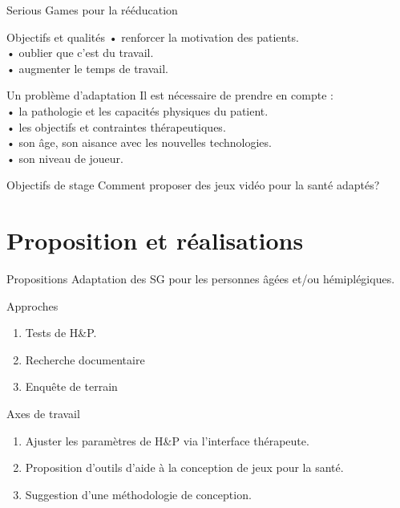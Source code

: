 \documentclass{beamer}
\begin{document}
		\begin{frame}{Serious Games pour la rééducation}
			\begin{exampleblock}{Objectifs et qualités}
				• renforcer la motivation des patients.\\
				• oublier que c'est du travail. \\
				• augmenter le temps de travail.
			\end{exampleblock}\pause
			\begin{alertblock}{Un problème d'adaptation}
			Il est nécessaire de prendre en compte :\\
					• la pathologie et les capacités physiques du patient.\\
					• les objectifs et contraintes thérapeutiques.\\
					• son âge, son aisance avec les nouvelles technologies.\\
					• son niveau de joueur.
			\end{alertblock}
		\end{frame}
	
		\begin{frame}{Objectifs de stage}		
			\large{Comment proposer des jeux vidéo pour la santé adaptés?}
		\end{frame}
		
	\section{Proposition et réalisations}	
		\begin{frame}{Propositions}
		Adaptation des SG pour les personnes âgées et/ou hémiplégiques.
			\begin{block}{Approches}
				\begin{enumerate}
					\item Tests de H\&P.
					\item Recherche documentaire
					\item Enquête de terrain
				\end{enumerate}
			\end{block}\pause
			\begin{exampleblock}{Axes de travail}			
				\begin{enumerate}
					\item Ajuster les paramètres de H\&P via l'interface thérapeute.
					\item Proposition d'outils d'aide à la conception de jeux pour la santé.
					\item Suggestion d'une méthodologie de conception.
				\end{enumerate}
			\end{exampleblock}
		\end{frame}		
				
\end{document}
